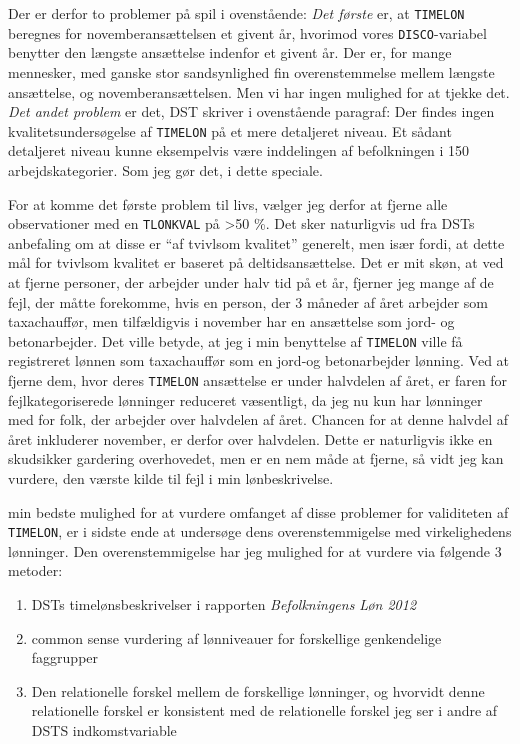 Der er derfor to problemer på spil i ovenstående: \emph{Det første} er, at \texttt{TIMELON} beregnes for novemberansættelsen et givent år, hvorimod vores \texttt{DISCO}-variabel benytter den længste ansættelse indenfor et givent år. Der er, for mange mennesker, med ganske stor sandsynlighed fin overenstemmelse mellem længste ansættelse, og novemberansættelsen. Men vi har ingen mulighed for at tjekke det. \emph{Det andet problem} er det, DST skriver i ovenstående paragraf: Der findes ingen kvalitetsundersøgelse af \texttt{TIMELON} på et mere detaljeret niveau. Et sådant detaljeret niveau kunne eksempelvis være inddelingen af befolkningen i 150 arbejdskategorier. Som jeg gør det, i dette speciale. 

For at komme det første problem til livs, vælger jeg derfor at fjerne alle observationer med en \texttt{TLONKVAL} på >50 \%. Det sker naturligvis ud fra DSTs anbefaling om at disse er “af tvivlsom kvalitet” generelt, men især fordi, at dette mål for tvivlsom kvalitet er baseret på deltidsansættelse. Det er mit skøn, at ved at fjerne personer, der arbejder under halv tid på et år, fjerner jeg mange af de fejl, der måtte forekomme, hvis en person, der 3 måneder af året arbejder som taxachauffør, men tilfældigvis i november har en ansættelse som jord- og betonarbejder. Det ville betyde, at jeg i min benyttelse af \texttt{TIMELON} ville få registreret lønnen som taxachauffør som en jord-og betonarbejder lønning. Ved at fjerne dem, hvor deres \texttt{TIMELON} ansættelse er under halvdelen af året, er faren for fejlkategoriserede lønninger reduceret væsentligt, da jeg nu kun har lønninger med for folk, der arbejder over halvdelen af året. Chancen for at denne halvdel af året inkluderer november, er derfor over halvdelen. Dette er naturligvis ikke en skudsikker gardering overhovedet, men er en nem måde at fjerne, så vidt jeg kan vurdere, den værste kilde til fejl i min lønbeskrivelse.

min bedste mulighed for at vurdere omfanget af disse problemer for validiteten af \texttt{TIMELON}, er i sidste ende at undersøge dens overenstemmigelse med virkelighedens lønninger. Den overenstemmigelse har jeg mulighed for at vurdere via følgende 3 metoder:

\begin{enumerate}
  \item DSTs timelønsbeskrivelser i rapporten \emph{Befolkningens Løn 2012}
  \item common sense vurdering af lønniveauer for forskellige genkendelige faggrupper
  \item Den relationelle forskel mellem de forskellige lønninger, og hvorvidt denne relationelle forskel er konsistent med de relationelle forskel jeg ser i andre af DSTS indkomstvariable
\end{enumerate}


